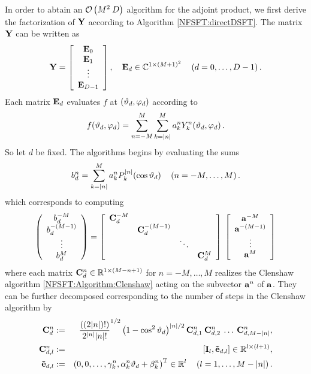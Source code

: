 In order to abtain an $\mathcal{O}\left(M^2 \: D\right)$ algorithm for the adjoint product, we first derive the factorization of $\mathbf{Y}$ according to Algorithm \ref{NFSFT:directDSFT}. The matrix $\mathbf{Y}$ can be written as
\[
  \mathbf{Y} = 
    \left[\begin{array}{c}
      \mathbf{E}_{0}\\
      \mathbf{E}_{1}\\
      \vdots\\
      \mathbf{E}_{D-1}
    \end{array}\right], \quad \mathbf{E}_{d} \in \mathbb{C}^{1 \times (M+1)^2} \quad \left(d=0,\ldots,D-1\right).
\]
Each matrix $\mathbf{E}_{d}$ evaluates $f$ at $\left(\vartheta_{d},\varphi_{d}\right)$ according to 
\[
  f{\hspace{-0.4ex}}\left(\vartheta_{d},\varphi_{d}\right) = \sum_{n=-M}^M \sum_{k=\left\vert n\right\vert}^M a_k^n Y_{k}^n{\hspace{-0.4ex}}\left(\vartheta_{d},\varphi_{d}\right).
\]
So let $d$ be fixed. The algorithms begins by evaluating the sums
\[
  b^{n}_{d} = \sum_{k=\left\vert n\right\vert}^M a_{k}^n P_{k}^{\left\vert n\right\vert}{\hspace{-0.4ex}}\left(\cos\vartheta_{d}\right) \quad \left(n=-M,\ldots,M\right). 
\]
which corresponds to computing
\[
  \left(\begin{array}{c}
    b^{-M}_{d}\\
    b^{-(M-1)}_{d}\\
    \vdots\\
    b^{M}_{d}
  \end{array}\right)
  =
  \left[\begin{array}{cccc}
    \mathbf{C}^{-M}_{d} &                    &        &               \\
                   & \mathbf{C}^{-(M-1)}_{d} &        &               \\
                   &                    & \ddots &               \\
                   &                    &        & \mathbf{C}^{M}_{d} 
  \end{array}\right]
  \:
  \left[\begin{array}{c}
    \mathbf{a}^{-M}\\
    \mathbf{a}^{-(M-1)}\\
    \vdots\\
    \mathbf{a}^{M}
  \end{array}\right]
\]
where each matrix $\mathbf{C}^{n}_{d} \in \mathbb{R}^{1 \times (M-n+1)}$ for $n = -M,\ldots,M$ realizes the Clenshaw algorithm \ref{NFSFT:Algorithm:Clenshaw} acting on the subvector $\mathbf{a}^n$ of $\mathbf{a}$.
They can be further decomposed corresponding to the number of steps in the Clenshaw algorithm by
\begin{eqnarray*}
  \mathbf{C}^{n}_{d}       & := & \frac{((2|n|)!)}{2^{|n|} |n|!}^{1/2} \left(1-\cos^2\vartheta_{d}\right)^{|n|/2} \mathbf{C}_{d,1}^{n} \: \mathbf{C}_{d,2}^{n} \: \ldots \: \mathbf{C}_{d,M-\left\vert n\right\vert}^{n},\\
  \mathbf{C}_{d,l}^{n}     & := & \left[\mathbf{I}_{l}, \mathbf{\tilde{e}}_{d,l}\right] \in \mathbb{R}^{l \times (l+1)},\\
  \mathbf{\tilde{e}}_{d,l} & := & \left(0,0,\ldots,\gamma_{k}^n,\alpha_{k}^n \vartheta_{d} + \beta_{k}^n\right)^{\text{\rm{T}}} \in \mathbb{R}^{l} \quad \left(l=1,\ldots,M-\left\vert n\right\vert\right).
\end{eqnarray*}
